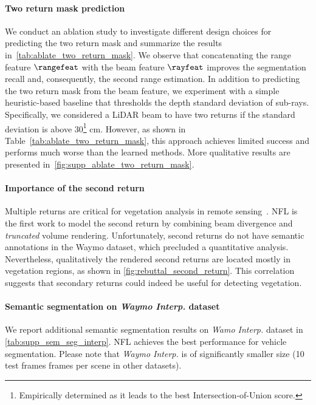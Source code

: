 \paragraph{Two return mask prediction}

We conduct an ablation study to investigate different design choices for predicting the two return mask and summarize the results in~\cref{tab:ablate_two_return_mask}. We observe that concatenating the range feature $\rangefeat$ with the beam feature $\rayfeat$ improves the segmentation recall and, consequently, the second range estimation. In addition to predicting the two return mask from the beam feature, we experiment with a simple heuristic-based baseline that thresholds the depth standard deviation of sub-rays. Specifically, we considered a LiDAR beam to have two returns if the standard deviation is above 30\footnote{Empirically determined as it leads to the best Intersection-of-Union score.} cm. However, as shown in Table~\ref{tab:ablate_two_return_mask}, this approach achieves limited success and performs much worse than the learned methods. More qualitative results are presented in~\cref{fig:supp_ablate_two_return_mask}. 

\paragraph{Importance of the second return}
Multiple returns are critical for vegetation analysis in remote sensing~\cite{lim2003lidar}. NFL is the first work to model the second return by combining beam divergence and \textit{truncated} volume rendering. Unfortunately, second returns do not have semantic annotations in the Waymo dataset, which precluded a quantitative analysis. Nevertheless, qualitatively the rendered second returns are located mostly in vegetation regions, as shown in \cref{fig:rebuttal_second_return}. This correlation suggests that secondary returns could indeed be useful for detecting vegetation. 


\paragraph{Semantic segmentation on \textit{Waymo Interp.} dataset}
We report additional semantic segmentation results on \textit{Wamo Interp.} dataset in \cref{tab:supp_sem_seg_interp}. NFL achieves the best performance for vehicle segmentation. Please note that \textit{Waymo Interp.} is of significantly smaller size (10 test frames  frames per scene in other datasets).

